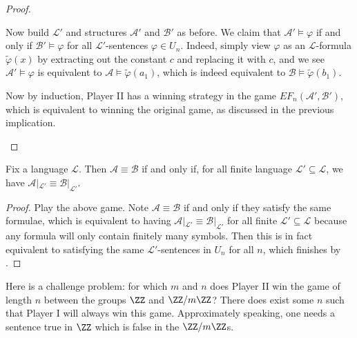 \documentclass[../notes.tex]{subfiles}
\begin{document}
\begin{proof}
\begin{itemize}
		Now build $\mathcal L'$ and structures $\mathcal A'$ and $\mathcal B'$ as before. We claim that $\mathcal A'\models\varphi$ if and only if $\mathcal B'\models\varphi$ for all $\mathcal L'$-sentences $\varphi\in U_n$. Indeed, simply view $\varphi$ as an $\mathcal L$-formula $\widetilde\varphi(x)$ by extracting out the constant $c$ and replacing it with $c$, and we see $\mathcal A'\models\varphi$ is equivalent to $\mathcal A\models\widetilde\varphi(a_1)$, which is indeed equivalent to $\mathcal B\models\widetilde\varphi(b_1)$.

		Now by induction, Player II has a winning strategy in the game $EF_n(\mathcal A',\mathcal B')$, which is equivalent to winning the original game, as discussed in the previous implication.
		\qedhere
	\end{itemize}
\end{proof}
\begin{corollary}
	Fix a language $\mathcal L$. Then $\mathcal A\equiv\mathcal B$ if and only if, for all finite language $\mathcal L'\subseteq\mathcal L$, we have $\mathcal A|_{\mathcal L'}\equiv\mathcal B|_{\mathcal L'}$.
\end{corollary}
\begin{proof}
	Play the above game. Note $\mathcal A\equiv\mathcal B$ if and only if they satisfy the same formulae, which is equivalent to having $\mathcal A|_{\mathcal L'}\equiv\mathcal B|_{\mathcal L'}$ for all finite $\mathcal L'\subseteq\mathcal L$ because any formula will only contain finitely many symbols. Then this is in fact equivalent to satisfying the same $\mathcal L'$-sentences in $U_n$ for all $n$, which finishes by .
\end{proof}
\begin{remark}
	Here is a challenge problem: for which $m$ and $n$ does Player II win the game of length $n$ between the groups $\ZZ$ and $\ZZ/m\ZZ$? There does exist some $n$ such that Player I will always win this game. Approximately speaking, one needs a sentence true in $\ZZ$ which is false in the $\ZZ/m\ZZ$s.
\end{remark}
\end{document}
